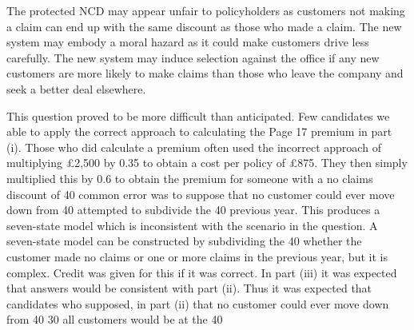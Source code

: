 \documentclass[a4paper,12pt]{article}
\begin{document}
The protected NCD may appear unfair to policyholders as customers not making a claim can end up with the same discount as those who made a claim. %
The new system may embody a moral hazard as it could make customers drive less carefully. 
The new system may induce selection against the office if any new customers are more likely to make claims than those who leave the company and seek a better deal elsewhere.

\newpage

This question proved to be more difficult than anticipated. Few
candidates we able to apply the correct approach to calculating the Page 17%
premium in part (i). Those who did calculate a premium often used the
incorrect approach of multiplying £2,500 by 0.35 to obtain a cost per
policy of £875. They then simply multiplied this by 0.6 to obtain the premium for someone with a no claims discount of 40%
common error was to suppose that no customer could ever move down from 40%
attempted to subdivide the 40%
previous year. This produces a seven-state model which is inconsistent
with the scenario in the question. A seven-state model can be constructed by subdividing the 40%
whether the customer made no claims or one or more claims in the
previous year, but it is complex. Credit was given for this if it was correct. In part (iii) it was expected that answers would be consistent
with part (ii). Thus it was expected that candidates who supposed, in part (ii) that no customer could ever move down from 40%
30%
all customers would be at the 40%
\end{document}
